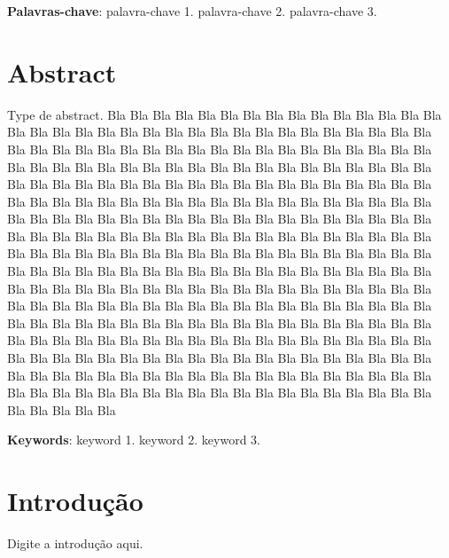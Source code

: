 \documentclass[a4paper,reqno,12pt,oneside]{book}
\begin{document}
\vspace{1.0cm}
\noindent
\textbf{Palavras-chave}: palavra-chave 1. palavra-chave 2. palavra-chave 3.


\chapter*{Abstract}
\thispagestyle{empty}
\noindent
Type de abstract.
Bla Bla Bla Bla Bla Bla Bla Bla Bla Bla Bla Bla Bla Bla Bla Bla Bla Bla 
Bla Bla Bla Bla Bla Bla Bla Bla Bla Bla Bla Bla Bla Bla Bla Bla Bla Bla 
Bla Bla Bla Bla Bla Bla Bla Bla Bla Bla Bla Bla Bla Bla Bla Bla Bla Bla 
Bla Bla Bla Bla Bla Bla Bla Bla Bla Bla Bla Bla Bla Bla Bla Bla Bla Bla 
Bla Bla Bla Bla Bla Bla Bla Bla Bla Bla Bla Bla Bla Bla Bla Bla Bla Bla 
Bla Bla Bla Bla Bla Bla Bla Bla Bla Bla Bla Bla Bla Bla Bla Bla Bla Bla 
Bla Bla Bla Bla Bla Bla Bla Bla Bla Bla Bla Bla Bla Bla Bla Bla Bla Bla 
Bla Bla Bla Bla Bla Bla Bla Bla Bla Bla Bla Bla Bla Bla Bla Bla Bla Bla 
Bla Bla Bla Bla Bla Bla Bla Bla Bla Bla Bla Bla Bla Bla Bla Bla Bla Bla 
Bla Bla Bla Bla Bla Bla Bla Bla Bla Bla Bla Bla Bla Bla Bla Bla Bla Bla 
Bla Bla Bla Bla Bla Bla Bla Bla Bla Bla Bla Bla Bla Bla Bla Bla Bla Bla 
Bla Bla Bla Bla Bla Bla Bla Bla Bla Bla Bla Bla Bla Bla Bla Bla Bla Bla 
Bla Bla Bla Bla Bla Bla Bla Bla Bla Bla Bla Bla Bla Bla Bla Bla Bla Bla 
Bla Bla Bla Bla Bla Bla Bla Bla Bla Bla Bla Bla Bla Bla Bla Bla Bla Bla 
Bla Bla Bla Bla Bla Bla Bla Bla Bla Bla Bla Bla Bla Bla Bla Bla Bla Bla 
Bla Bla Bla Bla Bla Bla Bla Bla Bla Bla Bla Bla Bla Bla Bla Bla Bla Bla 
Bla Bla Bla Bla Bla Bla Bla Bla Bla Bla Bla Bla Bla Bla Bla Bla Bla Bla 
Bla Bla Bla Bla Bla Bla Bla Bla Bla Bla Bla Bla Bla Bla Bla Bla Bla Bla 

\vspace{1.0cm}
\noindent
\textbf{Keywords}: keyword 1. keyword 2. keyword 3.




\chapter{Introdução}
\label{introducao}

Digite a introdução aqui.


\end{document}
